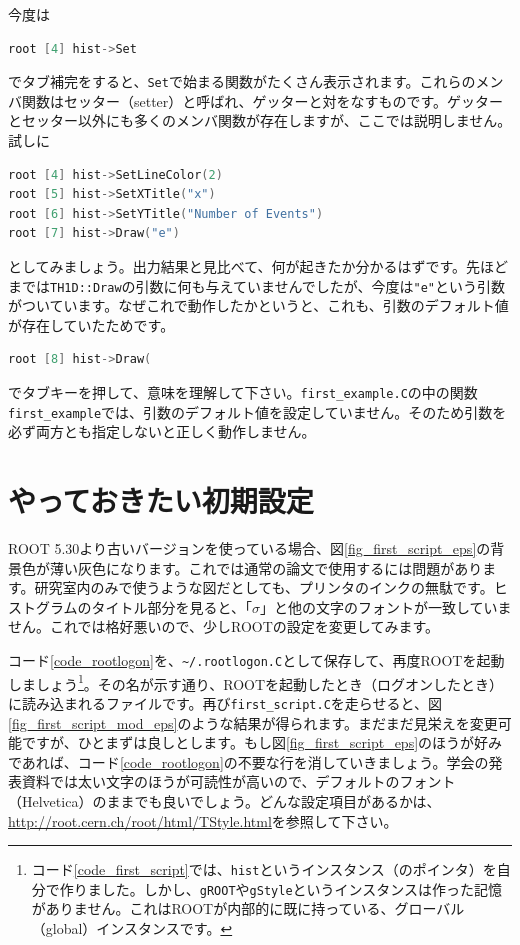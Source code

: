 今度は
\begin{lstlisting}[language=c++]
root [4] hist->Set
\end{lstlisting}
でタブ補完をすると、\texttt{Set}で始まる関数がたくさん表示されます。これらのメンバ関数はセッター（setter）と呼ばれ、ゲッターと対をなすものです。ゲッターとセッター以外にも多くのメンバ関数が存在しますが、ここでは説明しません。試しに
\begin{lstlisting}[language=c++]
root [4] hist->SetLineColor(2)
root [5] hist->SetXTitle("x")
root [6] hist->SetYTitle("Number of Events")
root [7] hist->Draw("e")
\end{lstlisting}
としてみましょう。出力結果と見比べて、何が起きたか分かるはずです。先ほどまでは\texttt{TH1D::Draw}の引数に何も与えていませんでしたが、今度は\texttt{"e"}という引数がついています。なぜこれで動作したかというと、これも、引数のデフォルト値が存在していたためです。
\begin{lstlisting}[language=c++]
root [8] hist->Draw(
\end{lstlisting}
でタブキーを押して、意味を理解して下さい。\texttt{first\_example.C}の中の関数\texttt{first\_example}では、引数のデフォルト値を設定していません。そのため引数を必ず両方とも指定しないと正しく動作しません。

\section{やっておきたい初期設定}

ROOT 5.30より古いバージョンを使っている場合、図\ref{fig_first_script_eps}の背景色が薄い灰色になります。これでは通常の論文で使用するには問題があります。研究室内のみで使うような図だとしても、プリンタのインクの無駄です。ヒストグラムのタイトル部分を見ると、「$\sigma$」と他の文字のフォントが一致していません。これでは格好悪いので、少しROOTの設定を変更してみます。

コード\ref{code_rootlogon}を、\texttt{\~{}/.rootlogon.C}として保存して、再度ROOTを起動しましょう\footnote{コード\ref{code_first_script}では、\texttt{hist}というインスタンス（のポインタ）を自分で作りました。しかし、\texttt{gROOT}や\texttt{gStyle}というインスタンスは作った記憶がありません。これはROOTが内部的に既に持っている、グローバル（global）インスタンスです。}。その名が示す通り、ROOTを起動したとき（ログオンしたとき）に読み込まれるファイルです。再び\texttt{first\_script.C}を走らせると、図\ref{fig_first_script_mod_eps}のような結果が得られます。まだまだ見栄えを変更可能ですが、ひとまずは良しとします。もし図\ref{fig_first_script_eps}のほうが好みであれば、コード\ref{code_rootlogon}の不要な行を消していきましょう。学会の発表資料では太い文字のほうが可読性が高いので、デフォルトのフォント（Helvetica）のままでも良いでしょう。どんな設定項目があるかは、\url{http://root.cern.ch/root/html/TStyle.html}を参照して下さい。

